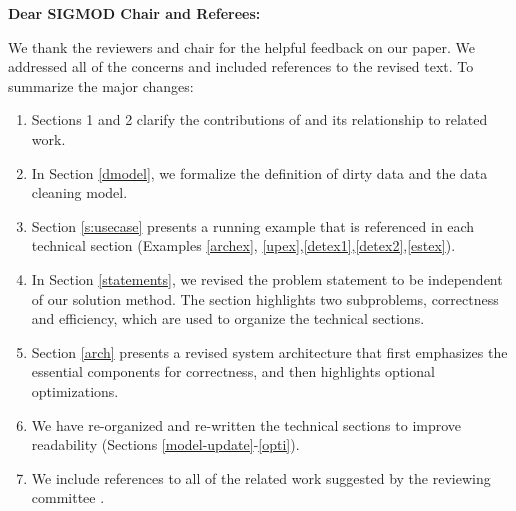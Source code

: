 {\noindent \normalsize \bf Dear SIGMOD Chair and Referees: }

\vspace{.5em}

We thank the reviewers and chair for the helpful feedback on our paper. 
We addressed all of the concerns and included references to the revised text. 
To summarize the major changes:

\begin{enumerate}
\item Sections 1 and 2 clarify the contributions of \sys and its relationship to related work.

\item In Section \ref{dmodel}, we formalize the definition of dirty data and the data cleaning model.

\item Section \ref{s:usecase} presents a running example that is referenced in each technical section (Examples \ref{archex}, \ref{upex},\ref{detex1},\ref{detex2},\ref{estex}).

\item In Section \ref{statements}, we revised the problem statement to be independent of our solution method. The section highlights two subproblems, correctness and efficiency, which are used to organize the technical sections.

\item Section \ref{arch} presents a revised system architecture that first emphasizes the essential components for correctness, and then highlights optional optimizations. 

\item We have re-organized and re-written the technical sections to improve readability (Sections \ref{model-update}-\ref{opti}).

\item We include references to all of the related work suggested by the reviewing committee \cite{whang2014incremental, papenbrock2015progressive, gruenheid2014incremental, DBLP:journals/pvldb/YakoutENOI11, yakout2013don, heise2014estimating}.
\end{enumerate}


